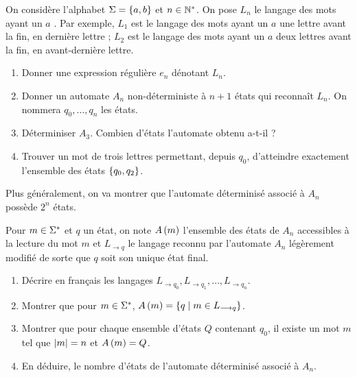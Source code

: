 \begin{corr}
\end{corr}

\begin{exo}
On considère l'alphabet \(\Sigma=\left\lbrace a,b\right\rbrace\) et \(n\in\mathbb{N}^*\). On pose \(L_n\) le langage des mots ayant un \(a\) . Par exemple, \(L_1\) est le langage des mots ayant un \(a\) une lettre avant la fin, \ie en dernière lettre ; \(L_2\) est le langage des mots ayant un \(a\) deux lettres avant la fin, \ie en avant-dernière lettre.

\begin{enumerate}[series=ex2.7]
    \item Donner une expression régulière \(e_n\) dénotant \(L_n\). \\
    \item Donner un automate \(A_n\) non-déterministe à \(n+1\) états qui reconnaît \(L_n\). On nommera \(q_0,\dots,q_n\) les états. \\
    \item Déterminiser \(A_3\). Combien d'états l'automate obtenu a-t-il ? \\
    \item Trouver un mot de trois lettres permettant, depuis \(q_0\), d'atteindre exactement l'ensemble des états \(\left\lbrace q_0,q_2\right\rbrace\).
\end{enumerate}

Plus généralement, on va montrer que l'automate déterminisé associé à \(A_n\) possède \(2^n\) états.

Pour \(m\in\Sigma^{*}\) et \(q\) un état, on note \(A\left(m\right)\) l'ensemble des états de \(A_n\) accessibles à la lecture du mot \(m\) et \(L_{\to q}\) le langage reconnu par l'automate \(A_n\) légèrement modifié de sorte que \(q\) soit son unique état final.

\begin{enumerate}[resume=ex2.7]
    \item Décrire en français les langages \(L_{\to q_0},L_{\to q_1},\dots,L_{\to q_n}\). \\
    \item Montrer que pour \(m\in\Sigma^{*}\), \(A\left(m\right)=\left\lbrace q\;\middle|\; m\in L_{\longrightarrow q}\right\rbrace\). \\
    \item Montrer que pour chaque ensemble d'états \(Q\) contenant \(q_0\), il existe un mot \(m\) tel que \(\left\lvert m\right\rvert=n\) et \(A\left(m\right)=Q\). \\
    \item En déduire, le nombre d'états de l'automate déterminisé associé à \(A_n\).
\end{enumerate}


\end{exo}
